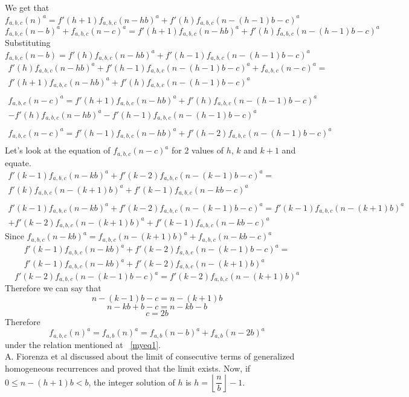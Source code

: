 \documentclass[preprint,12pt]{elsarticle}
\begin{document}
We get that $f_{a,b,c}(n)^a = f'(h+1)f_{a,b,c}(n-hb)^a + f'(h)f_{a,b,c}(n-(h-1)b-c)^a$
$$f_{a,b,c}(n-b)^a+f_{a,b,c}(n-c)^a=f'(h+1)f_{a,b,c}(n-hb)^a +f'(h)f_{a,b,c}(n-(h-1)b-c)^a$$
Substituting $f_{a,b,c}(n-b) = f'(h)f_{a,b,c}(n-hb)^a+f'(h-1)f_{a,b,c}(n-(h-1)b-c)^a$
\begin{multline*}
	f'(h)f_{a,b,c}(n-hb)^a+f'(h-1)f_{a,b,c}(n-(h-1)b-c)^a + f_{a,b,c}(n-c)^a =\\f'(h+1)f_{a,b,c}(n-hb)^a +f'(h)f_{a,b,c}(n-(h-1)b-c)^a\\\\
	f_{a,b,c}(n-c)^a = f'(h+1)f_{a,b,c}(n-hb)^a +f'(h)f_{a,b,c}(n-(h-1)b-c)^a \\-f'(h)f_{a,b,c}(n-hb)^a-f'(h-1)f_{a,b,c}(n-(h-1)b-c)^a\\\\
	f_{a,b,c}(n-c)^a = f'(h-1)f_{a,b,c}(n-hb)^a+f'(h-2)f_{a,b,c}(n-(h-1)b-c)^a\\
\end{multline*}
Let's look at the equation of $f_{a,b,c}(n-c)^a$ for 2 values of $h$, $k$ and $k+1$ and equate.
\begin{multline*}
	f'(k-1)f_{a,b,c}(n-kb)^a+f'(k-2)f_{a,b,c}(n-(k-1)b-c)^a =\\ f'(k)f_{a,b,c}(n-(k+1)b)^a+f'(k-1)f_{a,b,c}(n-kb-c)^a\\\\
	f'(k-1)f_{a,b,c}(n-kb)^a+f'(k-2)f_{a,b,c}(n-(k-1)b-c)^a =
	f'(k-1)f_{a,b,c}(n-(k+1)b)^a\\+f'(k-2)f_{a,b,c}(n-(k+1)b)^a +f'(k-1)f_{a,b,c}(n-kb-c)^a
\end{multline*}
Since $f_{a,b,c}(n-kb)^a = f_{a,b,c}(n-(k+1)b)^a+f_{a,b,c}(n-kb-c)^a$
\begin{multline*}
	f'(k-1)f_{a,b,c}(n-kb)^a+f'(k-2)f_{a,b,c}(n-(k-1)b-c)^a =\\ f'(k-1)f_{a,b,c}(n-kb)^a+f'(k-2)f_{a,b,c}(n-(k+1)b)^a
\end{multline*}
$$f'(k-2)f_{a,b,c}(n-(k-1)b-c)^a = f'(k-2)f_{a,b,c}(n-(k+1)b)^a$$
Therefore we can say that $$n-(k-1)b -c = n-(k+1)b$$
$$n-kb+b-c=n-kb-b$$
$$c = 2b$$
Therefore $$f_{a,b,c}(n)^a = f_{a,b}(n)^a = f_{a,b}(n-b)^a+f_{a,b}(n-2b)^a$$ under the relation mentioned at ~\eqref{myeq1}.\\
A. Fiorenza et al\cite{paper2} discussed about the limit of consecutive terms of generalized homogeneous recurrences and proved that the limit exists. 
Now, if $0 \leq n-(h+1)b < b$, the integer solution of $h$ is $h = \left\lfloor\dfrac{n}{b}\right\rfloor - 1$.
\end{document}
